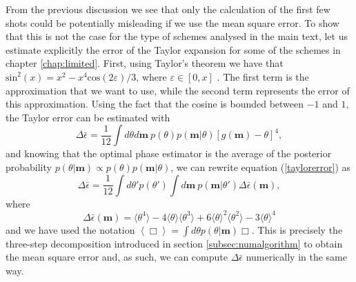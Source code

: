 From the previous discussion we see that only the calculation of the first few shots could be potentially misleading if we use the mean square error. To show that this is not the case for the type of schemes analysed in the main text, let us estimate explicitly the error of the Taylor expansion for some of the schemes in chapter \ref{chap:limited}. First, using Taylor's theorem we have that $\mathrm{sin}^2(x) = x^2-x^4 \mathrm{cos}(2\varepsilon)/3$, where $\varepsilon \in [0,x]$  \cite{mathematics2004}. The first term is the approximation that we want to use, while the second term represents the error of this approximation. Using the fact that the cosine is bounded between $-1$ and $1$, the Taylor error can be estimated with 
\begin{equation}
\Delta \bar{\epsilon} = \frac{1}{12}\int d\theta d\boldsymbol{m}~p(\theta) p(\boldsymbol{m}|\theta) \left[g(\boldsymbol{m})-\theta\right]^4,
\label{taylorerror}
\end{equation}
and knowing that the optimal phase estimator is the average of the posterior probability $p(\theta|\boldsymbol{m}) \propto p(\theta)p(\boldsymbol{m}|\theta)$, we can rewrite equation (\ref{taylorerror}) as
\begin{equation}
\Delta \bar{\epsilon} = \frac{1}{12}\int d\theta' p(\theta') \int d\boldsymbol{m}~ p(\boldsymbol{m}|\theta') \Delta \bar{\epsilon}(\boldsymbol{m}),
\end{equation}
where
\begin{equation}
\Delta \bar{\epsilon}(\boldsymbol{m}) = \langle \theta^4 \rangle- 4 \langle \theta \rangle \langle \theta^3 \rangle + 6\langle \theta \rangle^2 \langle \theta^2 \rangle - 3\langle \theta \rangle^4
\end{equation}
and we have used the notation $\left\langle \Box \right\rangle = \int d\theta p(\theta|\boldsymbol{m}) \Box$. This is precisely the three-step decomposition introduced in section \ref{subsec:numalgorithm} to obtain the mean square error and, as such, we can compute $\Delta \bar{\epsilon}$ numerically in the same way.

